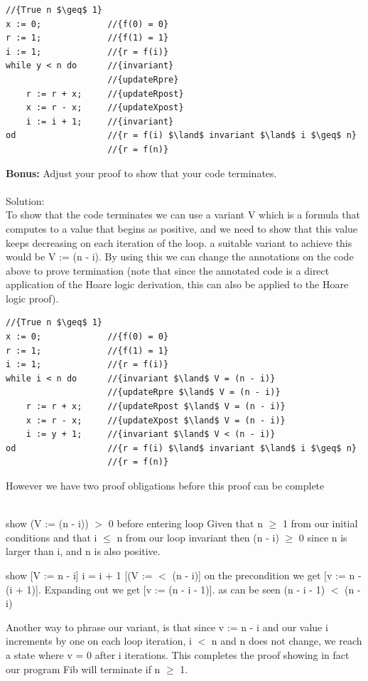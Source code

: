 \documentclass{article}
\newcommand*\moveToRight[1]{\hspace*{0em plus 1fill}\makebox{(#1)}}
\begin{document}
\begin{enumerate}[(a)]
\begin{lstlisting}[language=Maple,mathescape=true]
                    //{True n $\geq$ 1}
x := 0;             //{f(0) = 0}
r := 1;             //{f(1) = 1}
i := 1;             //{r = f(i)}
while y < n do      //{invariant}
                    //{updateRpre}
    r := r + x;     //{updateRpost}
    x := r - x;     //{updateXpost} 
    i := i + 1;     //{invariant}
od                  //{r = f(i) $\land$ invariant $\land$ i $\geq$ n}
                    //{r = f(n)}
    \end{lstlisting}
    \textbf{Bonus:} Adjust your proof to show that your code terminates. \moveToRight{3* marks}\\\\
    Solution:\\
    To show that the code terminates we can use a variant V which is a formula that computes to a value that begins as positive, and we need to show that this value keeps decreasing on each iteration of the loop. a suitable variant to achieve this would be V := (n - i). By using this we can change the annotations on the code above to prove termination (note that since the annotated code is a direct application of the Hoare logic derivation, this can also be applied to the Hoare logic proof).
\begin{lstlisting}[language=Maple,mathescape=true]
                    //{True n $\geq$ 1}
x := 0;             //{f(0) = 0}
r := 1;             //{f(1) = 1}
i := 1;             //{r = f(i)}
while i < n do      //{invariant $\land$ V = (n - i)}
                    //{updateRpre $\land$ V = (n - i)}
    r := r + x;     //{updateRpost $\land$ V = (n - i)}
    x := r - x;     //{updateXpost $\land$ V = (n - i)} 
    i := y + 1;     //{invariant $\land$ V < (n - i)}
od                  //{r = f(i) $\land$ invariant $\land$ i $\geq$ n}
                    //{r = f(n)}
\end{lstlisting}
However we have two proof obligations before this proof can be complete\\\\
 \begin{list}
        \item {show  (V := (n - i)) $>$ 0 before entering loop}
        Given that n $\geq$ 1 from our initial conditions and that i $\leq$ n from our loop invariant then (n - i) $\geq$ 0 since n is larger than i, and n is also positive.  
    \end{list}
 \begin{list}
        \item {show [V := n - i] i = i + 1 [(V :=  $<$ (n - i)]}
        on the precondition we get [v := n - (i + 1)]. Expanding out we get [v := (n - i - 1)]. as can be seen (n - i - 1)  $<$ (n - i)   
    \end{list}
Another way to phrase our variant, is that since v := n - i and our value i increments by one on each loop iteration, i $<$ n and n does not change, we reach a state where v = 0 after i iterations. This completes the proof showing in fact our program Fib will terminate if n $\geq$ 1.
\end{enumerate}
\end{document}
